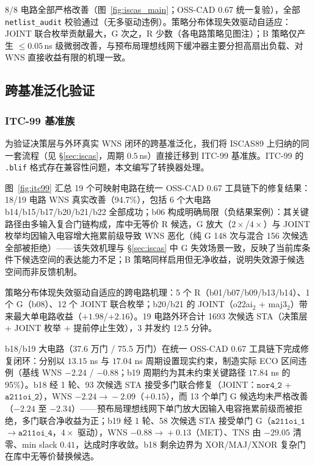\documentclass[journal]{IEEEtran}
\begin{document}
8/8 电路全部严格改善（图~\ref{fig:iscas_main}；OSS-CAD 0.67 统一复验），全部 \texttt{netlist\_audit} 校验通过（无多驱动违例）。策略分布体现失效驱动自适应：JOINT 联合枚举贡献最大，G 次之，R 少数（各电路策略见图注）；B 策略仅产生 $\le 0.05\,$ns 级微弱改善，与预布局理想线网下缓冲器主要分担高扇出负载、对 WNS 直接收益有限的机理一致。

\subsection{跨基准泛化验证}\label{sec:ood}

\subsubsection{ITC-99 基准族}\label{sec:itc99}

为验证决策层与外环真实 WNS 闭环的跨基准泛化，我们将 ISCAS89 上归纳的同一套流程（见 \S\ref{sec:iscas}，周期 $0.5\,$ns）直接迁移到 ITC-99 基准族。ITC-99 的 \texttt{.blif} 格式存在兼容性问题，本文编写了转换器处理。

图~\ref{fig:itc99} 汇总 19 个可映射电路在统一 OSS-CAD 0.67 工具链下的修复结果：18/19 电路 WNS 真实改善（94.7\%），包括 6 个大电路 b14/b15/b17/b20/b21/b22 全部成功；b06 构成明确局限（负结果案例）：其关键路径由多输入复合门链构成，库中无等价 R 候选，G 放大（$2\times$/$4\times$）与 JOINT 枚举均因输入电容增大拖累前级导致 WNS 恶化（纯 G 148 次与混合 156 次候选全部被拒绝）——该失效机理与 \S\ref{sec:iscas} 中 G 失效场景一致，反映了当前库条件下候选空间的表达能力不足；B 策略同样启用但无净收益，说明失效源于候选空间而非反馈机制。\par
策略分布体现失效驱动自适应的跨电路机理：5 个 R（b01/b07/b09/b13/b14）、1 个 G（b08）、12 个 JOINT 联合枚举；b20/b21 的 JOINT（o22ai$_2$ + maj3$_2$）带来最大单电路收益（$+1.98$/$+2.16$）。19 电路外环合计 1693 次候选 STA（决策层 + JOINT 枚举 + 提前停止生效），3 并发约 12.5 分钟。

b18/b19 大电路（37.6 万门 / 75.5 万门）在统一 OSS-CAD 0.67 工具链下完成修复闭环：分别以 $13.15$ ns 与 $17.04$ ns 周期设置现实约束，制造实际 ECO 区间违例（基线 WNS $-2.24$ / $-0.88$；b19 周期约为其未约束关键路径 $17.84$ ns 的 95\%）。b18 经 1 轮、93 次候选 STA 接受多门联合修复（JOINT：$\texttt{nor4\_2}$ + $\texttt{a211oi\_2}$），WNS $-2.24\!\rightarrow\!-2.09$（$+0.15$），而 13 个单门 G 候选均未严格改善（$-2.24$ 至 $-2.34$）——预布局理想线网下单门放大因输入电容拖累前级而被拒绝，多门联合净收益为正；b19 经 1 轮、58 次候选 STA 接受单门 G（$\texttt{a211oi\_1}$$\rightarrow$$\texttt{a211oi\_4}$，$4\times$ 驱动），WNS $-0.88\!\rightarrow\!+0.13$（MET）、TNS 由 $-29.05$ 清零、min slack $0.41$，达成时序收敛。b18 剩余边界为 XOR/MAJ/XNOR 复杂门在库中无等价替换候选。
\end{document}
